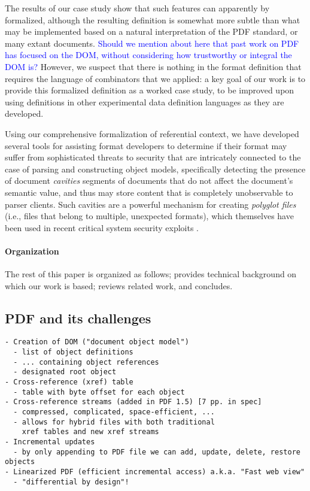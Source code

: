 The results of our case study show that such features can apparently
by formalized, although the resulting definition is somewhat more
subtle than what may be implemented based on a natural interpretation
of the PDF standard, or many extant documents. \textcolor{blue}{Should we mention about here that past work on PDF has focused on the DOM, without considering how trustworthy or integral the DOM is?} 
%
However, we suspect that there is nothing in the format definition
that requires the language of combinators that we applied: a key goal
of our work is to provide this formalized definition as a worked case
study, to be improved upon using definitions in other experimental
data definition languages as they are developed.

Using our comprehensive formalization of referential context, we have
developed several tools for assisting format developers to determine
if their format may suffer from sophisticated threats to security that
are intricately connected to the case of parsing and constructing object models,
specifically detecting the presence of document \emph{cavities}
segments of documents that do not affect the document's semantic
value, and thus may store content that is completely unobservable to
parser clients.
%
Such cavities are a powerful mechanism for creating \emph{polyglot
  files} (i.e., files that belong to multiple, unexpected formats),
which themselves have been used in recent critical system security
exploits .

\paragraph*{Organization} The rest of this paper is organized as
follows;
%
 provides technical background on which our work
is based;
%
%
 reviews related work, and %
 concludes.

\subsection{PDF and its challenges}
\label{sec:pdf-challenges}

\begin{lstlisting}[style=meta]
- Creation of DOM ("document object model")
  - list of object definitions
  - ... containing object references
  - designated root object
- Cross-reference (xref) table
  - table with byte offset for each object
- Cross-reference streams (added in PDF 1.5) [7 pp. in spec]
  - compressed, complicated, space-efficient, ...
  - allows for hybrid files with both traditional
    xref tables and new xref streams
- Incremental updates
  - by only appending to PDF file we can add, update, delete, restore objects
- Linearized PDF (efficient incremental access) a.k.a. "Fast web view"
  - "differential by design"!
\end{lstlisting}

